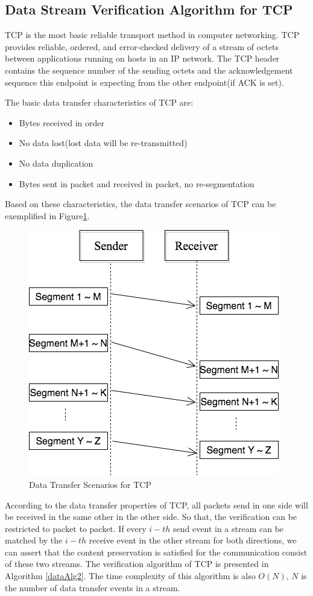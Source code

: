 \subsection{Data Stream Verification Algorithm for TCP}
TCP is the most basic reliable transport method in computer networking. TCP provides reliable, ordered, and error-checked delivery of a stream of octets between applications running on hosts in an IP network. The TCP header contains the sequence number of the sending octets and the acknowledgement sequence this endpoint is expecting from the other endpoint(if ACK is set). 

The basic data transfer characteristics of TCP are:
\begin{itemize}
  \item Bytes received in order
  \item No data lost(lost data will be re-transmitted)
  \item No data duplication
  \item Bytes sent in packet and received in packet, no re-segmentation
\end{itemize}

Based on these characteristics,  the data transfer scenarios of TCP can be exemplified in Figure\ref{tcp}.
\begin{figure}[H]
\centerline{\includegraphics[scale=0.4]{Figures/tcp}}
 \caption{Data Transfer Scenarios for TCP}
\label{tcp}
\end{figure}

According to the data transfer properties of TCP, all packets send in one side will be received in the same other in the other side. So that, the verification can be restricted to packet to packet. If every $i-th$ send event in a stream can be matched by the $i-th$ receive event in the other stream for both directions, we can assert that the content preservation is satisfied for the communication consist of these two streams. The verification algorithm of TCP is presented in Algorithm \ref{dataAlg2}. The time complexity of this algorithm is also $O(N)$, $N$ is the number of data transfer events in a stream.

